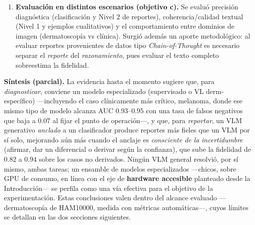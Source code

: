 \documentclass[11pt, a4paper]{article}
\begin{document}
\begin{enumerate}[leftmargin=1.6em]
  el reporte —otra manifestación de que lo determinante es la representación especializada—. El
  \emph{grounding} simple, sin embargo, sigue comprometiéndose con un único diagnóstico aun cuando el
  clasificador tiene baja confianza. El \textbf{ensamble consciente de la incertidumbre}
  (Sección~\ref{sec:incertidumbre}) resuelve esto: afirma cuando dos clasificadores baratos coinciden,
  da un diferencial cuando no, y deriva a un especialista en el $4\%$ de máxima ambigüedad. Validado
  \emph{end-to-end} sobre los reportes generados, sube la \emph{diagnostic consistency} de $0.82$
  (\emph{grounding} simple) a $\mathbf{0.94}$ sobre los casos no derivados (Cuadro~\ref{tab:incertidumbre_e2e}),
  y en el subconjunto donde el clasificador duda, el reporte diferencial menciona el diagnóstico correcto el
  $90\%$ de las veces frente al $39\%$ del \emph{grounding} forzado.
  \item \textbf{Evaluación en distintos escenarios (objetivo c).} Se evaluó precisión diagnóstica
  (clasificación y Nivel 2 de reportes), coherencia/calidad textual (Nivel 1 y ejemplos cualitativos) y
  el comportamiento entre dominios de imagen (dermatoscopía vs clínica). Surgió además un aporte
  metodológico: al evaluar reportes provenientes de datos tipo \emph{Chain-of-Thought} es necesario
  separar el \emph{reporte} del \emph{razonamiento}, pues evaluar el texto completo sobreestima la
  fidelidad.
\end{enumerate}

\noindent\textbf{Síntesis (parcial).} La evidencia hasta el momento sugiere que, para \emph{diagnosticar},
conviene un modelo especializado (supervisado o VL derm-específico) —incluyendo el caso clínicamente más
crítico, melanoma, donde ese mismo tipo de modelo alcanza AUC $0.93$--$0.95$ con una tasa de falsos
negativos que baja a $0.07$ al fijar el punto de operación—, y que, para \emph{reportar}, un VLM
generativo \emph{anclado} a un clasificador produce reportes más fieles que un VLM por sí solo, mejorando
aún más cuando el anclaje es \emph{consciente de la incertidumbre} (afirmar, dar un diferencial o derivar
según la confianza), que sube la fidelidad de $0.82$ a $0.94$ sobre los casos no derivados. Ningún
VLM general resolvió, por sí mismo, ambas tareas; un ensamble de modelos especializados —chicos, sobre
GPU de consumo, en línea con el eje de \textbf{hardware accesible} planteado desde la
Introducción— se perfila como una vía efectiva para el objetivo de la experimentación. Estas conclusiones
valen dentro del alcance evaluado —dermatoscopía de HAM10000, medida con métricas automáticas—, cuyos
límites se detallan en las dos secciones siguientes.
\end{document}
